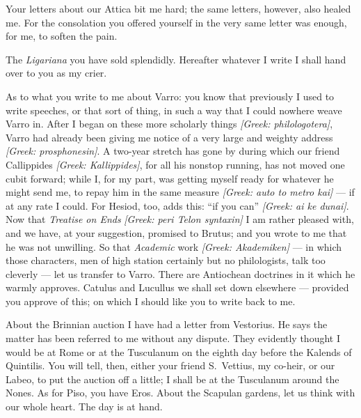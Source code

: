 

 Your letters about our Attica bit me hard; the same letters, however, also healed me. For the consolation you offered yourself in the very same letter was enough, for me, to soften the pain.

 The \textit{Ligariana} you have sold splendidly. Hereafter whatever I write I shall hand over to you as my crier.

 As to what you write to me about Varro: you know that previously I used to write speeches, or that sort of thing, in such a way that I could nowhere weave Varro in. After I began on these more scholarly things \textit{[Greek: philologotera]}, Varro had already been giving me notice of a very large and weighty address \textit{[Greek: prosphonesin]}. A two-year stretch has gone by during which our friend Callippides \textit{[Greek: Kallippides]}, for all his nonstop running, has not moved one cubit forward; while I, for my part, was getting myself ready for whatever he might send me, to repay him in the same measure \textit{[Greek: auto to metro kai]} --- if at any rate I could. For Hesiod, too, adds this: ``if you can'' \textit{[Greek: ai ke dunai]}. Now that \textit{Treatise on Ends} \textit{[Greek: peri Telon syntaxin]} I am rather pleased with, and we have, at your suggestion, promised to Brutus; and you wrote to me that he was not unwilling. So that \textit{Academic} work \textit{[Greek: Akademiken]} --- in which those characters, men of high station certainly but no philologists, talk too cleverly --- let us transfer to Varro. There are Antiochean doctrines in it which he warmly approves. Catulus and Lucullus we shall set down elsewhere --- provided you approve of this; on which I should like you to write back to me.

 About the Brinnian auction I have had a letter from Vestorius. He says the matter has been referred to me without any dispute. They evidently thought I would be at Rome or at the Tusculanum on the eighth day before the Kalends of Quintilis. You will tell, then, either your friend S.~Vettius, my co-heir, or our Labeo, to put the auction off a little; I shall be at the Tusculanum around the Nones. As for Piso, you have Eros. About the Scapulan gardens, let us think with our whole heart. The day is at hand.
